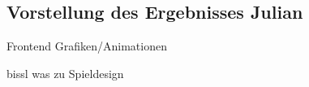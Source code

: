 

\subsection{Vorstellung des Ergebnisses Julian}

Frontend
Grafiken/Animationen 

bissl was zu Spieldesign